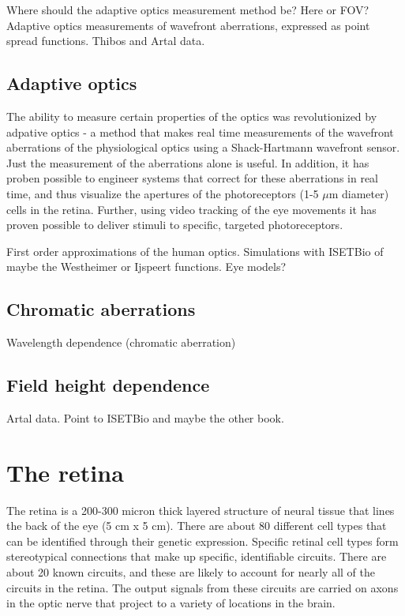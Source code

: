 \documentclass[
  letterpaper,
]{book}
\begin{document}
Where should the adaptive optics measurement method be? Here or FOV?
Adaptive optics measurements of wavefront aberrations, expressed as
point spread functions. Thibos and Artal data.

\subsection{Adaptive optics}\label{adaptive-optics}

The ability to measure certain properties of the optics was
revolutionized by adpative optics - a method that makes real time
measurements of the wavefront aberrations of the physiological optics
using a Shack-Hartmann wavefront sensor. Just the measurement of the
aberrations alone is useful. In addition, it has proben possible to
engineer systems that correct for these aberrations in real time, and
thus visualize the apertures of the photoreceptors (1-5 \(\mu \text{m}\)
diameter) cells in the retina. Further, using video tracking of the eye
movements it has proven possible to deliver stimuli to specific,
targeted photoreceptors.

First order approximations of the human optics. Simulations with ISETBio
of maybe the Westheimer or Ijspeert functions. Eye models?

\subsection{Chromatic aberrations}\label{chromatic-aberrations}

Wavelength dependence (chromatic aberration)

\subsection{Field height dependence}\label{field-height-dependence}

Artal data. Point to ISETBio and maybe the other book.

\section{The retina}\label{the-retina}

The retina is a 200-300 micron thick layered structure of neural tissue
that lines the back of the eye (5 cm x 5 cm). There are about 80
different cell types that can be identified through their genetic
expression. Specific retinal cell types form stereotypical connections
that make up specific, identifiable circuits. There are about 20 known
circuits, and these are likely to account for nearly all of the circuits
in the retina. The output signals from these circuits are carried on
axons in the optic nerve that project to a variety of locations in the
brain.
\end{document}
